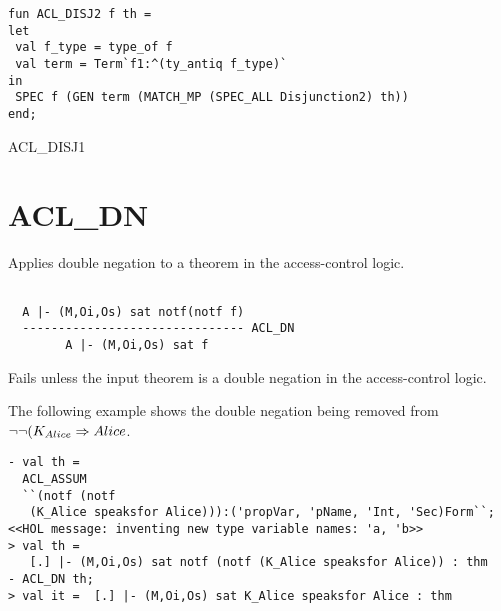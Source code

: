 \IMPLEMENTATION
\begin{holboxed}
\begin{verbatim}
fun ACL_DISJ2 f th = 
let
 val f_type = type_of f
 val term = Term`f1:^(ty_antiq f_type)`
in
 SPEC f (GEN term (MATCH_MP (SPEC_ALL Disjunction2) th))
end;
\end{verbatim}
\end{holboxed}

\SEEALSO
ACL\_DISJ1
\ENDDOC

\section{ACL\_DN}

 


\egroup

\SYNOPSIS
Applies double negation to a theorem in the access-control logic.

\DESCRIPTION
\begin{verbatim}

  A |- (M,Oi,Os) sat notf(notf f)
  ------------------------------- ACL_DN
        A |- (M,Oi,Os) sat f
\end{verbatim}

\FAILURE
Fails unless the input theorem is a double negation in the
access-control logic.

\EXAMPLE The following example shows the double negation being removed
from $\neg\neg(K_{Alice} \Rightarrow Alice$.
\begin{holboxed}
\begin{verbatim}
- val th = 
  ACL_ASSUM 
  ``(notf (notf 
   (K_Alice speaksfor Alice))):('propVar, 'pName, 'Int, 'Sec)Form``;
<<HOL message: inventing new type variable names: 'a, 'b>>
> val th =  
   [.] |- (M,Oi,Os) sat notf (notf (K_Alice speaksfor Alice)) : thm
- ACL_DN th;
> val it =  [.] |- (M,Oi,Os) sat K_Alice speaksfor Alice : thm
\end{verbatim}
\end{holboxed}

